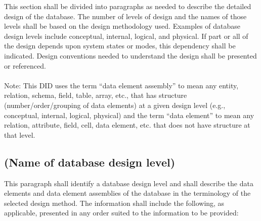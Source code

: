 This section shall be divided into paragraphs as needed to describe the
detailed design of the database. The number of levels of design and the
names of those levels shall be based on the design methodology used.
Examples of database design levels include conceptual, internal,
logical, and physical. If part or all of the design depends upon system
states or modes, this dependency shall be indicated. Design conventions
needed to understand the design shall be presented or referenced. \\\\
Note: This DID uses the term ``data element assembly'' to mean any
entity, relation, schema, field, table, array, etc., that has structure
(number/order/grouping of data elements) at a given design level (e.g.,
conceptual, internal, logical, physical) and the term ``data element''
to mean any relation, attribute, field, cell, data element, etc. that
does not have structure at that level.

\subsection{(Name of database design level)}

This paragraph shall identify a database design level and shall describe
the data elements and data element assemblies of the database in the
terminology of the selected design method. The information shall include
the following, as applicable, presented in any order suited to the
information to be provided:

